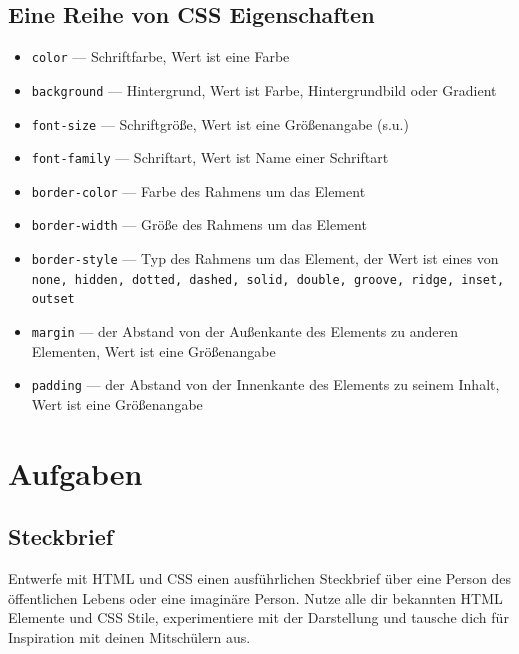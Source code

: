 \documentclass[ngerman,11pt]{article}
\begin{document}
    \subsection{Eine Reihe von CSS Eigenschaften}

    \begin{itemize}
        \item \verb_color_ --- Schriftfarbe, Wert ist eine Farbe
        \item \verb_background_ --- Hintergrund, Wert ist Farbe, Hintergrundbild oder Gradient
        \item \verb_font-size_ --- Schriftgröße, Wert ist eine Größenangabe (s.u.)
        \item \verb_font-family_ --- Schriftart, Wert ist Name einer Schriftart
        \item \verb_border-color_ --- Farbe des Rahmens um das Element
        \item \verb_border-width_ --- Größe des Rahmens um das Element
        \item \verb_border-style_ --- Typ des Rahmens um das Element, der Wert ist eines von \lstinline{none, hidden, dotted, dashed, solid, double, groove, ridge, inset, outset}
        \item \verb_margin_ --- der Abstand von der Außenkante des Elements zu anderen Elementen, Wert ist eine Größenangabe
        \item \verb_padding_ --- der Abstand von der Innenkante des Elements zu seinem Inhalt, Wert ist eine Größenangabe
    \end{itemize}



    \section{Aufgaben}

    \subsection{Steckbrief}

    Entwerfe mit HTML und CSS einen ausführlichen Steckbrief über eine Person des öffentlichen Lebens oder eine imaginäre Person.
    Nutze alle dir bekannten HTML Elemente und CSS Stile, experimentiere mit der Darstellung und tausche dich für Inspiration
    mit deinen Mitschülern aus.
\end{document}
